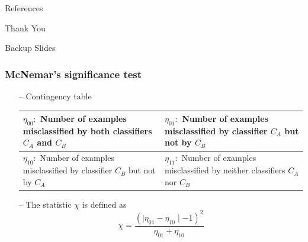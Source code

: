 \documentclass{beamer}
\begin{document}
\begin{frame}[allowframebreaks]{References}    

\end{frame}


\begin{frame}
\Huge{\centerline{Thank You}}
\end{frame}


\begin{frame}[noframenumbering]
\Huge{\centerline{Backup Slides}}
\end{frame}


\begin{frame}[noframenumbering] \label{McNemar's significance test}
\frametitle{McNemar's significance test}
\begin{itemize}
\item[--] Contingency table \\ 

\vspace{0.5cm}

\begin{tabular}{p{5cm}|p{5cm}}
\hline 
$\eta_{00}:$ Number of examples misclassified by both classifiers $C_A$ and $C_B$ & $\eta_{01}:$ Number of examples misclassified by classifier $C_A$ but not by $C_B$ \\ 
\hline 
$\eta_{10}:$ Number of examples misclassified by classifier $C_B$ but not by $C_A$  & $\eta_{11}:$ Number of examples misclassified by neither classifiers $C_A$ nor $C_B$ \\ 
\hline 
\end{tabular}

\vspace{0.5cm}

\item[--] The statistic $\chi$ is defined as 
\begin{equation*}
\chi = \frac{(\mid\eta_{01} - \eta_{10}\mid - 1)^2}{\eta_{01} + \eta_{10}}
\end{equation*}
\end{itemize}

\hyperlink{Evaluation Measures}{\beamerreturnbutton{}}

\end{frame}
\end{document}

